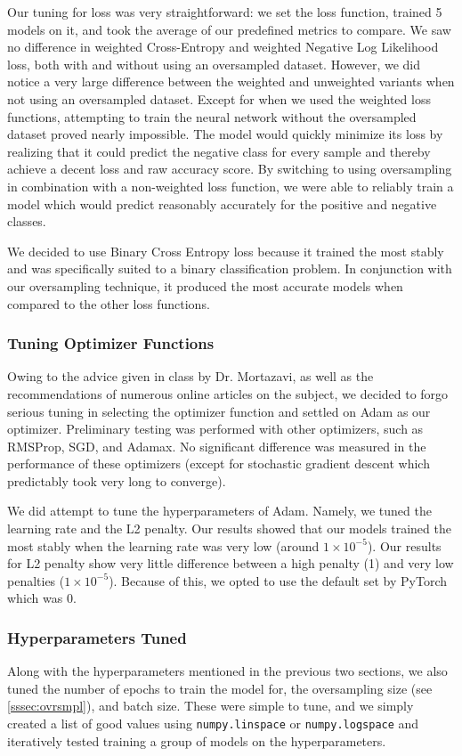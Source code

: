\documentclass{article}
\begin{document}
Our tuning for loss was very straightforward: we set the loss function, trained 5 models on it, and took the average of our predefined
metrics to compare. We saw no difference in weighted Cross-Entropy and weighted Negative Log Likelihood loss, both with and without using
an oversampled dataset. However, we did notice a very large difference between the weighted and unweighted variants when not using an
oversampled dataset. Except for when we used the weighted loss functions, attempting to train the neural network without the oversampled
dataset proved nearly impossible. The model would quickly minimize its loss by realizing that it could predict the negative class for every
sample and thereby achieve a decent loss and raw accuracy score. By switching to using oversampling in combination with a non-weighted 
loss function, we were able to reliably train a model which would predict reasonably accurately for the positive and negative classes.

We decided to use Binary Cross Entropy loss because it trained the most stably and was specifically suited to a binary classification 
problem. In conjunction with our oversampling technique, it produced the most accurate models when compared to the other loss functions. 

\subsubsection{Tuning Optimizer Functions}
\label{sssec:optim}
Owing to the advice given in class by Dr. Mortazavi, as well as the recommendations of numerous online articles on the subject, we decided to
forgo serious tuning in selecting the optimizer function and settled on Adam as our optimizer. Preliminary testing was performed with other
optimizers, such as RMSProp, SGD, and Adamax. No significant difference was measured in the performance of these optimizers (except for 
stochastic gradient descent which predictably took very long to converge). 

We did attempt to tune the hyperparameters of Adam. Namely, we tuned the learning rate and the L2 penalty. Our results showed that our
models trained the most stably when the learning rate was very low (around $1 \times 10^{-5}$). Our results for L2 penalty show very 
little difference between a high penalty (1) and very low penalties ($1 \times 10^{-5}$). Because of this, we opted to use the default set 
by PyTorch which was 0. 

\subsubsection{Hyperparameters Tuned}
Along with the hyperparameters mentioned in the previous two sections, we also tuned the number of epochs to train the model for, the 
oversampling size (see \ref{sssec:ovrsmpl}), and batch size. These were simple to tune, and we simply created a list of good values using
\verb|numpy.linspace| or \verb|numpy.logspace| and iteratively tested training a group of models on the hyperparameters. 
\end{document}
